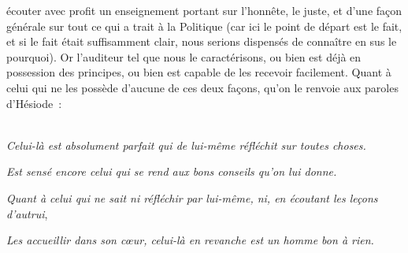 \documentclass[french,twoside]{book} %
\begin{document}
écouter avec profit un enseignement portant sur l’honnête, le juste, et d’une façon générale sur tout ce qui a trait à la Politique (car ici le point de départ est le fait, et si le fait était suffisamment clair, nous serions dispensés de connaître en sus le pourquoi). Or l’auditeur tel que nous le caractérisons, ou bien est déjà en possession des principes, ou bien est capable de les recevoir facilement. Quant à celui qui ne les possède d’aucune de ces deux façons, qu’on le renvoie aux paroles d’Hésiode :\par
 \\
 {\itshape Celui-là est absolument parfait qui de lui-même réfléchit sur toutes choses.} \par
 {\itshape Est sensé encore celui qui se rend aux bons conseils qu’on lui donne.} \par
{\itshape Quant à celui qui ne sait ni réfléchir par lui-même, ni, en écoutant les leçons d’autrui}, \par
 {\itshape Les accueillir dans son cœur, celui-là en revanche est un homme bon à rien.} 
\end{document}
